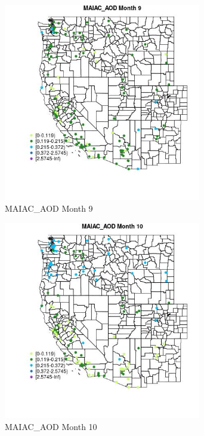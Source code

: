 \begin{figure} 
\centering  
\includegraphics[width=0.77\textwidth]{Code_Outputs/Report_ML_input_PM25_Step4_part_e_de_duplicated_aves_MapObsMo9MAIAC_AOD.jpg} 
\caption{\label{fig:Report_ML_input_PM25_Step4_part_e_de_duplicated_avesMapObsMo9MAIAC_AOD}MAIAC_AOD Month 9} 
\end{figure} 
 

\begin{figure} 
\centering  
\includegraphics[width=0.77\textwidth]{Code_Outputs/Report_ML_input_PM25_Step4_part_e_de_duplicated_aves_MapObsMo10MAIAC_AOD.jpg} 
\caption{\label{fig:Report_ML_input_PM25_Step4_part_e_de_duplicated_avesMapObsMo10MAIAC_AOD}MAIAC_AOD Month 10} 
\end{figure} 
 

